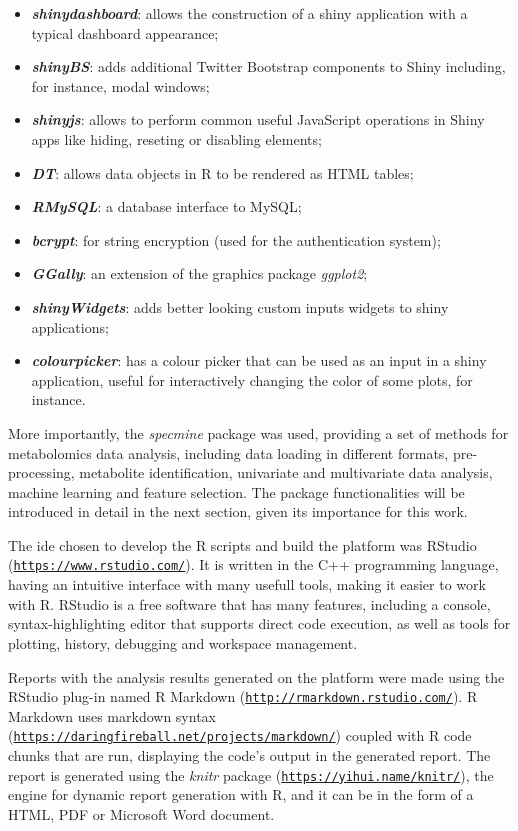 \begin{itemize}
	\item \textit{\textbf{shinydashboard}}: allows the construction of a shiny application with a typical dashboard appearance;
	\item \textit{\textbf{shinyBS}}: adds additional Twitter Bootstrap components to Shiny including, for instance, modal windows;
	\item \textit{\textbf{shinyjs}}: allows to perform common useful JavaScript operations in Shiny apps like hiding, reseting or disabling elements;
	\item \textit{\textbf{DT}}: allows data objects in R to be rendered as HTML tables;
	\item \textit{\textbf{RMySQL}}: a database interface to MySQL;
	\item \textit{\textbf{bcrypt}}: for string encryption (used for the authentication system);
	\item \textit{\textbf{GGally}}:	an extension of the graphics package \textit{ggplot2};
	\item \textit{\textbf{shinyWidgets}}: adds better looking custom inputs widgets to shiny applications;	
	\item \textit{\textbf{colourpicker}}: has a colour picker that can be used as an input in a shiny application, useful for interactively changing the color of some plots, for instance.
\end{itemize}

More importantly, the \textit{specmine} package was used, providing a set of methods for me\-ta\-bo\-lo\-mics data analysis, including data loading in different formats, pre-processing, metabolite identification, univariate and multivariate data analysis, machine learning and feature selection. The package functionalities will be introduced in detail in the next section, given its importance for this work.

The \gls{ide} chosen to develop the R scripts and build the platform was RStudio (\href{https://www.rstudio.com/}{\nolinkurl{https://www.rstudio.com/}}). It is written in the C++ programming language, having an intuitive interface with many usefull tools, making it easier to work with R. RStudio is a free software that has many features, including a console, syntax-highlighting editor that supports direct code execution, as well as tools for plotting, history, debugging and workspace management. 

Reports with the analysis results generated on the platform were made using the RStudio plug-in named R Markdown (\href{http://rmarkdown.rstudio.com/}{\nolinkurl{http://rmarkdown.rstudio.com/}}). R Markdown uses markdown syntax (\href{https://daringfireball.net/projects/markdown/}{\nolinkurl{https://daringfireball.net/projects/markdown/}}) coupled with R code chunks that are run, displaying the code's output in the generated report. The report is generated using the \textit{knitr} package (\href{https://yihui.name/knitr/}{\nolinkurl{https://yihui.name/knitr/}}), the engine for dynamic report generation with R, and it can be in the form of a HTML, PDF or Microsoft Word document. 

